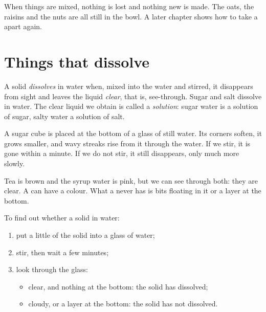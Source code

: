 \begin{remark}\label{rem:g2:mixing-and-dissolving:nothing-lost}
When things are mixed, nothing is lost and nothing new is made. The
oats, the raisins and the nuts are all still in the bowl. A later
chapter shows how to take a  apart again.
\end{remark}

\section{Things that dissolve}

\begin{definition}\label{def:g2:mixing-and-dissolving:dissolve}
A solid \emph{dissolves} in water when, mixed into the
water and stirred, it disappears from sight and leaves the liquid
\emph{clear}, that is, see-through. Sugar and salt dissolve in water.
The clear liquid we obtain is called a
\emph{solution}: sugar water is a solution of sugar,
salty water a solution of salt.
\end{definition}

\begin{example}\label{ex:g2:mixing-and-dissolving:cube}
A sugar cube is placed at the bottom of a glass of still water. Its
corners soften, it grows smaller, and wavy streaks rise from it through
the water. If we stir, it is gone within a minute. If we do not stir, it
still disappears, only much more slowly.
\end{example}

\begin{remark}\label{rem:g2:mixing-and-dissolving:clear}
Tea is brown and the syrup water is pink, but we can see through both:
they are clear. A  can have a colour. What a  never has
is bits floating in it or a layer at the bottom.
\end{remark}

\begin{method}\label{met:g2:mixing-and-dissolving:test}
To find out whether a solid  in water:
\begin{enumerate}
  \item put a little of the solid into a glass of water;
  \item stir, then wait a few minutes;
  \item look through the glass:
    \begin{itemize}
      \item clear, and nothing at the bottom: the solid has dissolved;
      \item cloudy, or a layer at the bottom: the solid has not dissolved.
    \end{itemize}
\end{enumerate}
\end{method}

